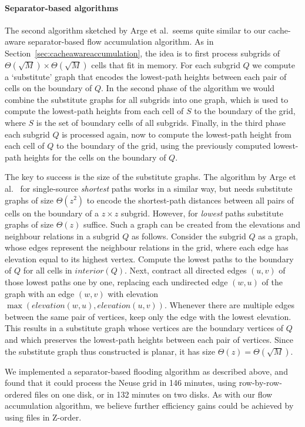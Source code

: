 \documentclass[10pt,a4paper]{article}
\begin{document}
\paragraph{Separator-based algorithms}
The second algorithm sketched by Arge et al.\ seems quite similar to our cache-aware separator-based flow accumulation algorithm. As in Section~\ref{sec:cacheawareaccumulation}, the idea is to first process subgrids of $\Theta(\sqrt M) \times \Theta(\sqrt M)$ cells that fit in memory. For each subgrid $Q$ we compute a `substitute' graph that encodes the lowest-path heights between each pair of cells on the boundary of $Q$. In the second phase of the algorithm we would combine the substitute graphs for all subgrids into one graph, which is used to compute the lowest-path heights from each cell of $S$ to the boundary of the grid, where $S$ is the set of boundary cells of all subgrids. Finally, in the third phase each subgrid $Q$ is processed again, now to compute the lowest-path height from each cell of $Q$ to the boundary of the grid, using the previously computed lowest-path heights for the cells on the boundary of $Q$.

The key to success is the size of the substitute graphs. The algorithm by Arge et al.~\cite{gridproblems} for single-source \emph{shortest} paths works in a similar way, but needs substitute graphs of size $\Theta(z^2)$ to encode the shortest-path distances between all pairs of cells on the boundary of a $z \times z$ subgrid. However, for \emph{lowest} paths substitute graphs of size $\Theta(z)$ suffice. Such a graph can be created from the elevations and neighbour relations in a subgrid $Q$ as follows. Consider the subgrid $Q$ as a graph, whose edges represent the neighbour relations in the grid, where each edge has elevation equal to its highest vertex. Compute the lowest paths to the boundary of $Q$ for all cells in $\mathit{interior}(Q)$. Next, contract all directed edges $(u,v)$ of those lowest paths one by one, replacing each undirected edge $(w,u)$ of the graph with an edge $(w,v)$ with elevation $\max(\mathit{elevation}(w,u),\mathit{elevation}(u,v))$. Whenever there are multiple edges between the same pair of vertices, keep only the edge with the lowest elevation. This results in a substitute graph whose vertices are the boundary vertices of $Q$ and which preserves the lowest-path heights between each pair of vertices. Since the substitute graph thus constructed is planar, it has size $\Theta(z) = \Theta(\sqrt M)$.

We implemented a separator-based flooding algorithm as described above, and found that it could process the Neuse grid in 146 minutes, using row-by-row-ordered files on one disk, or in 132 minutes on two disks. As with our flow accumulation algorithm, we believe further efficiency gains could be achieved by using files in Z-order.
\end{document}
